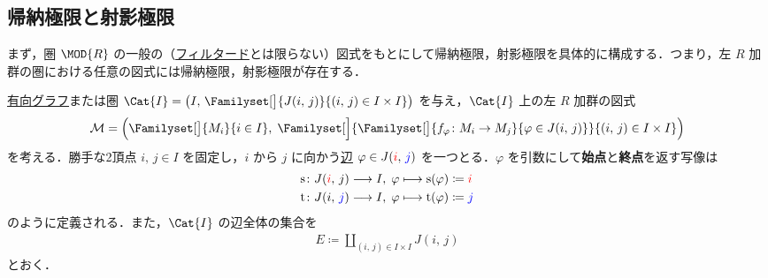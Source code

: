 \documentclass[algtopo_main]{subfiles}
\begin{document}
\subsection{帰納極限と射影極限}

まず，圏 $\MOD{R}$ の一般の（\hyperref[def:filtered]{フィルタード}とは限らない）図式をもとにして帰納極限，射影極限を具体的に構成する．つまり，左 $R$ 加群の圏における任意の図式には帰納極限，射影極限が存在する．

\hyperref[def:DG]{有向グラフ}または圏 $\Cat{I} = \bigl( I,\, \Familyset[\big]{J(i,\, j)}{(i,\, j) \in I\times I} \bigr)$ を与え，$\Cat{I}$ 上の左 $R$ 加群の図式
\begin{align}
	\mathcal{M} = \Bigl( \Familyset[\big]{M_i}{i \in I},\; \Familyset[\Big]{\Familyset[\big]{f_\varphi \colon M_i \to M_j}{\varphi \in J(i,\, j)}}{(i,\, j) \in I \times I} \Bigr)
\end{align}
を考える．勝手な2頂点 $i,\, j \in I$ を固定し，$i$ から $j$ に向かう\hyperref[def:DG]{辺} $\varphi \in J(\textcolor{red}{i},\, \textcolor{blue}{j})$ を一つとる．$\varphi$ を引数にして\textbf{始点}と\textbf{終点}を返す写像は
\begin{align}
	\mathrm{s} &\colon J(\textcolor{red}{i},\, j) \longrightarrow I,\; \varphi \longmapsto \mathrm{s}(\varphi) \coloneqq \textcolor{red}{i} \\
	\mathrm{t} &\colon J(i,\, \textcolor{blue}{j}) \longrightarrow I,\; \varphi \longmapsto \mathrm{t}(\varphi) \coloneqq \textcolor{blue}{j}
\end{align}
のように定義される．また，$\Cat{I}$ の辺全体の集合を
\begin{align}
	E \coloneqq \coprod_{(i,\, j) \in I\times I} J(i,\, j)
\end{align}
とおく．
\end{document}
